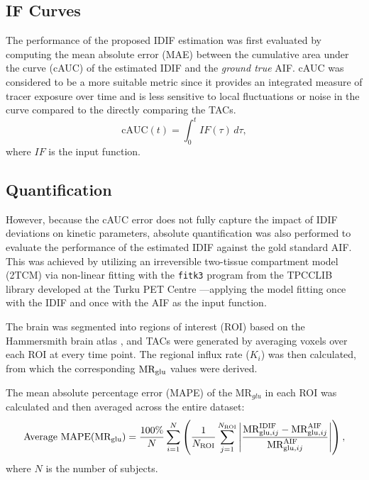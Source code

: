 \subsection{IF Curves}
The performance of the proposed IDIF estimation was first evaluated by computing the mean absolute error (MAE) between the cumulative area under the curve (cAUC) of the estimated IDIF and the \textit{ground true} AIF. cAUC was considered to be a more suitable metric since it provides an integrated measure of tracer exposure over time and is less sensitive to local fluctuations or noise in the curve compared to the directly comparing the TACs.
\begin{equation}
	\textrm{cAUC}(t) =  \int_{0}^{t} IF(\tau) \, d\tau,
\end{equation}
where \(IF\) is the input function.

\subsection{Quantification}
However, because the cAUC error does not fully capture the impact of IDIF deviations on kinetic parameters, absolute quantification was also performed to evaluate the performance of the estimated IDIF against the gold standard AIF.
This was achieved by utilizing an irreversible two-tissue compartment model (2TCM) via non-linear fitting with the \texttt{fitk3} program from the TPCCLIB library developed at the Turku PET Centre \cite{oikonen2018tpcclib}—applying the model fitting once with the IDIF and once with the AIF as the input function.

The brain was segmented into regions of interest (ROI) based on the Hammersmith brain atlas \cite{hammers2003three}, and TACs were generated by averaging voxels over each ROI at every time point.
The regional influx rate (\(K_i\)) was then calculated, from which the corresponding \(\text{MR}_{\text{glu}}\) values were derived.

The mean absolute percentage error (MAPE) of the \(\textrm{MR}_{glu}\) in each ROI was calculated and then averaged across the entire dataset:
\begin{equation}
	\text{Average MAPE}(\text{MR}_{\text{glu}})= \frac{100\%}{N} \sum_{i=1}^{N} \left( \frac{1}{N_{\text{ROI}}} \sum_{j=1}^{N_{\text{ROI}}} \left| \frac{\textrm{MR}_{\textrm{glu},ij}^{\textrm{IDIF}} - \textrm{MR}_{\textrm{glu},ij}^{\textrm{AIF}}}{\textrm{MR}_{\textrm{glu},ij}^{\textrm{AIF}}} \right| \right),
\end{equation}
where $N$ is the number of subjects.

